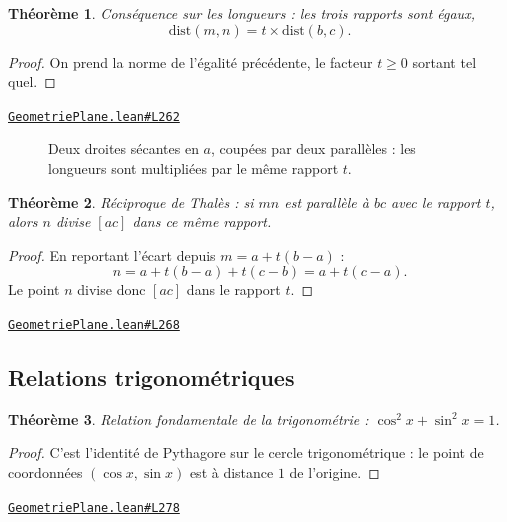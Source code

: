 \documentclass[11pt,a4paper]{article}
\theoremstyle{definition}
\theoremstyle{plain}
\newtheorem{theoreme}{Théorème}
\newcommand{\source}[2]{\par\smallskip\noindent\hfill{\footnotesize\href{#1}{\texttt{#2}}}\par\smallskip}
\begin{document}
\begin{theoreme}
Conséquence sur les longueurs : les trois rapports sont égaux,
\[ \mathrm{dist}(m, n) = t \times \mathrm{dist}(b, c) . \]
\end{theoreme}

\begin{proof}
On prend la norme de l'égalité précédente, le facteur $t \ge 0$ sortant tel quel.
\end{proof}
\source{https://github.com/Commutator-IO/learn-lean/blob/main/courses/01-college/02-geometrie-plane/GeometriePlane.lean\#L262}{GeometriePlane.lean\#L262}

\begin{figure}[h]
\centering

\caption{Deux droites sécantes en $a$, coupées par deux parallèles : les longueurs sont multipliées par le même rapport $t$.}
\end{figure}

\begin{theoreme}
Réciproque de Thalès : si $mn$ est parallèle à $bc$ avec le rapport $t$, alors $n$
divise $[ac]$ dans ce même rapport.
\end{theoreme}

\begin{proof}
En reportant l'écart depuis $m = a + t(b-a)$ :
\[ n = a + t(b-a) + t(c-b) = a + t(c-a) . \]
Le point $n$ divise donc $[ac]$ dans le rapport $t$.
\end{proof}
\source{https://github.com/Commutator-IO/learn-lean/blob/main/courses/01-college/02-geometrie-plane/GeometriePlane.lean\#L268}{GeometriePlane.lean\#L268}

\subsection{Relations trigonométriques}

\begin{theoreme}
Relation fondamentale de la trigonométrie : $\cos^2 x + \sin^2 x = 1$.
\end{theoreme}

\begin{proof}
C'est l'identité de Pythagore sur le cercle trigonométrique : le point de coordonnées
$(\cos x, \sin x)$ est à distance $1$ de l'origine.
\end{proof}
\source{https://github.com/Commutator-IO/learn-lean/blob/main/courses/01-college/02-geometrie-plane/GeometriePlane.lean\#L278}{GeometriePlane.lean\#L278}
\end{document}
